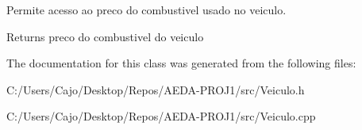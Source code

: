 Permite acesso ao preco do combustivel usado no veiculo. 

\begin{DoxyReturn}{Returns}
preco do combustivel do veiculo 
\end{DoxyReturn}


The documentation for this class was generated from the following files\+:\begin{DoxyCompactItemize}
\item 
C\+:/\+Users/\+Cajo/\+Desktop/\+Repos/\+A\+E\+D\+A-\/\+P\+R\+O\+J1/src/Veiculo.\+h\item 
C\+:/\+Users/\+Cajo/\+Desktop/\+Repos/\+A\+E\+D\+A-\/\+P\+R\+O\+J1/src/Veiculo.\+cpp\end{DoxyCompactItemize}
